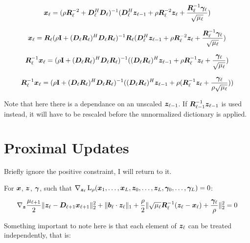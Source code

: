 \begin{equation}
\bm{x}_{\ell} = (\rho \bm{R}_{\ell}^{-2} + \bm{D}_{\ell}^H\bm{D}_{\ell})^{-1}(\bm{D}_{\ell}^H\bm{z}_{\ell - 1} + \rho \bm{R}_{\ell}^{-2}\bm{z}_{\ell} + \frac{\bm{R}_{\ell}^{-1}\bm{\gamma}_{\ell}}{\sqrt{\mu_{\ell}}})
\end{equation}

\begin{equation}
\bm{x}_{\ell} = \bm{R}_{\ell}(\rho {\bf I} + (\bm{D}_{\ell}\bm{R}_{\ell})^H\bm{D}_{\ell}\bm{R}_{\ell})^{-1}\bm{R}_{\ell}(\bm{D}_{\ell}^H\bm{z}_{\ell - 1} + \rho \bm{R}_{\ell}^{-2}\bm{z}_{\ell} + \frac{\bm{R}_{\ell}^{-1}\bm{\gamma}_{\ell}}{\sqrt{\mu_{\ell}}})
\end{equation}

\begin{equation}
\bm{R}_{\ell}^{-1}\bm{x}_{\ell} = (\rho {\bf I} + (\bm{D}_{\ell}\bm{R}_{\ell})^H\bm{D}_{\ell}\bm{R}_{\ell})^{-1}((\bm{D}_{\ell}\bm{R}_{\ell})^H\bm{z}_{\ell - 1} + \rho \bm{R}_{\ell}^{-1}\bm{z}_{\ell} + \frac{\bm{\gamma}_{\ell}}{\sqrt{\mu_{\ell}}})
\end{equation}

\begin{equation}
\bm{R}_{\ell}^{-1}\bm{x}_{\ell} = (\rho {\bf I} + (\bm{D}_{\ell}\bm{R}_{\ell})^H\bm{D}_{\ell}\bm{R}_{\ell})^{-1}((\bm{D}_{\ell}\bm{R}_{\ell})^H\bm{z}_{\ell - 1} + \rho (\bm{R}_{\ell}^{-1}\bm{z}_{\ell} + \frac{\bm{\gamma}_{\ell}}{\rho\sqrt{\mu_{\ell}}}))
\end{equation}

Note that here there is a dependance on an unscaled $\bm{z}_{\ell - 1}$. If $\bm{R}_{\ell - 1}^{-1} \bm{z}_{\ell - 1}$ is used instead, it will have to be rescaled before the unnormalized dictionary is applied.

\section{Proximal Updates}

Briefly ignore the positive constraint, I will return to it.

For $\bm{x}$, $\bm{z}$, $\bm{\gamma}$, such that $\nabla_{\bm{z}_{\ell}} \operatorname{L}_{\rho}(\bm{x}_1,\hdots,\bm{x}_L,\bm{z}_0,\hdots,\bm{z}_L,\bm{\gamma}_0,\hdots,\bm{\gamma}_L) = 0$:

\begin{equation}
\nabla_{\bm{z}} \frac{\mu_{\ell + 1}}{2}\|\bm{z}_{\ell} - \bm{D}_{\ell + 1}\bm{x}_{\ell + 1}\|_2^2 + \|\bm{b}_{\ell} \cdot \bm{z}_{\ell}\|_1 + \frac{\rho}{2} \|\sqrt{\mu_{\ell}}\bm{R}_{\ell}^{-1}(\bm{z}_{\ell} - \bm{x}_{\ell}) + \frac{\bm{\gamma}_{\ell}}{\rho}\|_2^2 = 0
\end{equation}

Something important to note here is that each element of $\bm{z}_{\ell}$ can be treated independently, that is:

